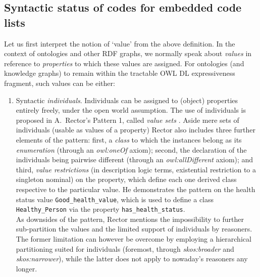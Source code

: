 \subsection{Syntactic status of codes for embedded code lists}
\label{ss:def_type}
Let us first interpret the notion of `value' from the above definition.
In the context of ontologies and other RDF graphs, we normally speak about \emph{values} in reference to \emph{properties} to which these values are assigned.
For ontologies (and knowledge graphs) to remain within the tractable OWL DL expressiveness fragment, such values can be either:
\begin{enumerate}
    \item Syntactic \emph{individuals}. 
    Individuals can be assigned to (object) properties entirely freely, under the open world assumption.
    The use of individuals is proposed in A.~Rector's Pattern 1, called \emph{value sets} \cite{alanrector}.
    Aside mere sets of individuals (usable as values of a property) Rector also includes three further elements of the pattern: first, a \emph{class} to which the instances belong as its \emph{enumeration} (through an \emph{owl:oneOf} axiom); second, the declaration of the individuals being pairwise different (through an \emph{owl:allDifferent} axiom); and third, \emph{value restrictions} (in description logic terms, existential restriction to a singleton nominal) on the property, which define each one derived class respective to the particular value.
    He demonstrates the pattern on the health status value \texttt{Good\_health\_value}, which is used to define a class \texttt{Healthy\_Person} via the property \texttt{has\_health\_status}. \\
    As downsides of the pattern, Rector mentions the impossibility to further sub-partition the values and the limited support of individuals by reasoners. The former limitation can however be overcome by employing a hierarchical partitioning suited for individuals (foremost, through \emph{skos:broader} and \emph{skos:narrower}), while the latter does not apply to nowaday's reasoners any longer.


\end{enumerate}
